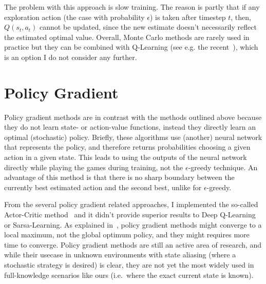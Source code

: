 The problem with this approach is slow training. The reason is partly that if any exploration action (the case with probability $\epsilon$) is taken after timestep $t$, then, $Q(s_t,a_t)$ cannot be updated, since the new estimate doesn't necessarily reflect the estimated optimal value. Overall, Monte Carlo methods are rarely used in practice but they can be combined with Q-Learning (see e.g. the recent~\cite{wang2018montecarloqlearning}), which is an option I do not consider any further.

\section{Policy Gradient}

Policy gradient methods are in contrast with the methods outlined above because they do not learn state- or action-value functions, instead they directly learn an optimal (stochastic) policy. Briefly, these algorithms use (another) neural network that represents the policy, and therefore returns probabilities choosing a given action in a given state. This leads to using the outputs of the neural network directly while playing the games during training, not the $\epsilon$-greedy technique. An advantage of this method is that there is no sharp boundary between the currently best estimated action and the second best, unlike for $\epsilon$-greedy. 



From the several policy gradient related approaches, I implemented the so-called Actor-Critic method~\cite{grondman2012actorcritic} and it didn't provide superior results to Deep Q-Learning or Sarsa-Learning. As explained in~\cite{bhandari2019policygradientconvergence}, policy gradient methods might converge to a local maximum, not the global optimum policy, and they might requires more time to converge. Policy gradient methods are still an active area of research, and while their usecase in unknown environments with state aliasing (where a stochastic strategy is desired) is clear, they are not yet the most widely used in full-knowledge scenarios like ours (i.e.\ where the exact current state is known).